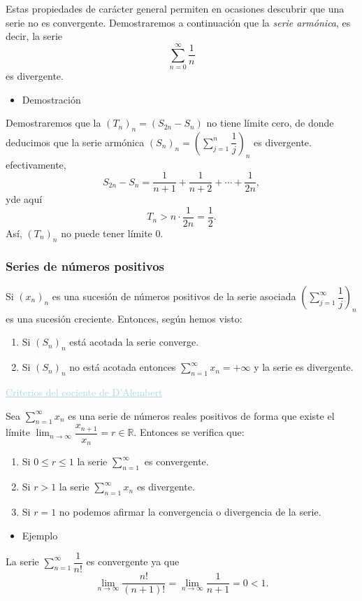 \documentclass[12pt]{article}
\begin{document}
Estas propiedades de carácter general permiten en ocasiones descubrir que una serie no es convergente. Demostraremos a continuación que la \textit{serie armónica}, es decir, la serie \[  \sum_{n=0}^{\infty}\dfrac{1}{n} \] es divergente.
\begin{itemize}[label=\color{red}\textbullet, leftmargin=*]
	\item \color{lightblue}Demostración
\end{itemize}
Demostraremos que la $(T_n)_n=(S_{2n}-S_n)$ no tiene límite cero, de donde deducimos que la serie armónica $(S_n)_n=\left(\sum_{j=1}^{n}\dfrac{1}{j}\right)_n$ es divergente. efectivamente, \[ S_{2n}-S_n=\dfrac{1}{n+1}+\dfrac{1}{n+2}+\cdots+\dfrac{1}{2n}, \]  yde aquí \[ T_n>n\cdot\dfrac{1}{2n}=\dfrac{1}{2}. \] Así, $(T_n)_n$ no puede tener límite 0.
\subsubsection{Series de números positivos}
Si $(x_n)_n$ es una sucesión de números positivos de la serie asociada $\left(\sum_{j=1}^{\infty}\dfrac{1}{j}\right)_n$ es una sucesión creciente. Entonces, según hemos visto:
\begin{enumerate}[label=\arabic*)]
	\item Si $(S_n)_n$ está acotada la serie converge.
	\item Si $(S_n)_n$ no está acotada entonces $\sum_{n=1}^{\infty}x_n=+ \infty$ y la serie es divergente.
\end{enumerate}
\textcolor{lightblue}{\underline{Criterios del cociente de D'Alembert}}

Sea $\sum_{n=1}^{\infty}x_n$ es una serie de números reales positivos de forma que existe el límite $\lim_{n\to\infty}\dfrac{x_{n+1}}{x_n}=r\in\mathbb{R}$. Entonces se verifica que:
\begin{enumerate}[label=\arabic*)]
	\item Si $0\le r\le1$ la serie $\sum_{n=1}^{\infty}$ es convergente.
	\item Si $r>1$ la serie $ \sum_{n=1}^{\infty}x_n$ es divergente.
	\item Si $r=1$ no podemos afirmar la convergencia o divergencia de la serie.
\end{enumerate}
\begin{itemize}[label=\color{red}\textbullet, leftmargin=*]
	\item \color{lightblue}Ejemplo
\end{itemize}
La serie $\sum_{n=1}^{\infty}\dfrac{1}{n!}$ es convergente ya que $$\lim_{n\to\infty}\dfrac{n!}{(n+1)!}=\lim_{n\to\infty}\dfrac{1}{n+1}=0<1.$$
\end{document}
